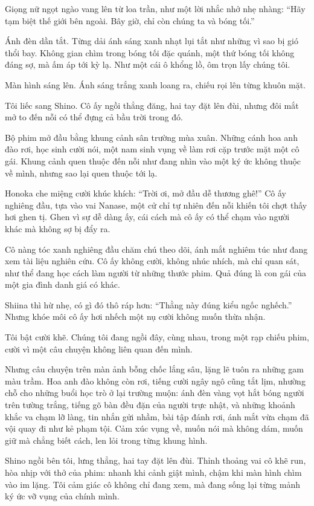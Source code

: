 \documentclass[../main.tex]{subfiles}
\begin{document}
Giọng nữ ngọt ngào vang lên từ loa trần, như một lời nhắc nhở nhẹ nhàng: ``Hãy tạm biệt thế giới bên ngoài. Bây giờ, chỉ còn chúng ta và bóng tối.''

Ánh đèn dần tắt. Từng dải ánh sáng xanh nhạt lụi tắt như những vì sao bị gió thổi bay. Không gian chìm trong bóng tối đặc quánh, một thứ bóng tối không đáng sợ, mà ấm áp tới kỳ lạ. Như một cái ô khổng lồ, ôm trọn lấy chúng tôi.

Màn hình sáng lên. Ánh sáng trắng xanh loang ra, chiếu rọi lên từng khuôn mặt.

Tôi liếc sang Shino. Cô ấy ngồi thẳng đăng, hai tay đặt lên đùi, nhưng đôi mắt mở to đến nỗi có thể đựng cả bầu trời trong đó.

Bộ phim mở đầu bằng khung cảnh sân trường mùa xuân. Những cánh hoa anh đào rơi, học sinh cười nói, một nam sinh vụng về làm rơi cặp trước mặt một cô gái. Khung cảnh quen thuộc đến nỗi như đang nhìn vào một ký ức không thuộc về mình, nhưng sao lại quen thuộc tới lạ.

Honoka che miệng cười khúc khích: ``Trời ơi, mở đầu dễ thương ghê!'' Cô ấy nghiêng đầu, tựa vào vai Nanase, một cử chỉ tự nhiên đến nỗi khiến tôi chợt thấy hơi ghen tị. Ghen vì sự dễ dàng ấy, cái cách mà cô ấy có thể chạm vào người khác mà không sợ bị đẩy ra.

Cô nàng tóc xanh nghiêng đầu chăm chú theo dõi, ánh mắt nghiêm túc như đang xem tài liệu nghiên cứu.
Cô ấy không cười, không nhúc nhích, mà chỉ quan sát, như thể đang học cách làm người từ những thước phim. Quả đúng là con gái của một gia đình danh giá có khác.

Shiina thì hừ nhẹ, có gì đó thô ráp hơn: ``Thằng này đúng kiểu ngốc nghếch.'' Nhưng khóe môi cô ấy hơi nhếch một nụ cười không muốn thừa nhận.

Tôi bật cười khẽ. Chúng tôi đang ngồi đây, cùng nhau, trong một rạp chiếu phim, cười vì một câu chuyện không liên quan đến mình.

Nhưng câu chuyện trên màn ảnh bỗng chốc lắng sâu, lặng lẽ tuôn ra những gam màu trầm. Hoa anh đào không còn rơi, tiếng cười ngây ngô cũng tắt lịm, nhường chỗ cho những buổi học trò ở lại trường muộn: ánh đèn vàng vọt hắt bóng người trên tường trắng, tiếng gõ bàn đều đặn của người trực nhật, và những khoảnh khắc va chạm lỡ làng, tin nhắn gửi nhầm, bài tập đánh rơi, ánh mắt vừa chạm đã vội quay đi như kẻ phạm tội. Cảm xúc vụng về, muốn nói mà không dám, muốn giữ mà chẳng biết cách, len lỏi trong từng khung hình.

Shino ngồi bên tôi, lưng thẳng, hai tay đặt lên đùi. Thỉnh thoảng vai cô khẽ run, hòa nhịp với thở của phim: nhanh khi cảnh giật mình, chậm khi màn hình chìm vào im lặng. Tôi cảm giác cô không chỉ đang xem, mà đang sống lại từng mảnh ký ức vỡ vụng của chính mình.
\end{document}
